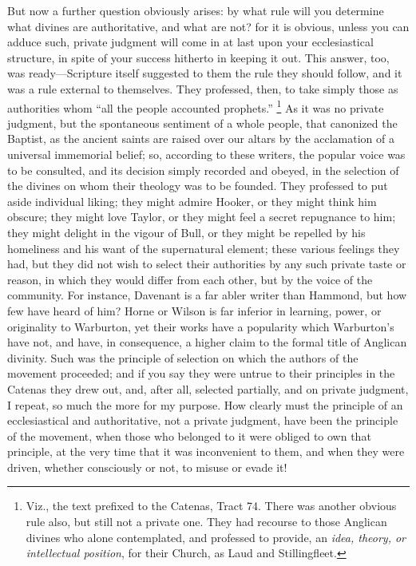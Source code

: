 But now a further question obviously arises: by what rule will you
determine what divines are authoritative, and what are not? for it is
obvious, unless you can adduce such, private judgment will come in at
last upon your ecclesiastical structure, in spite of your success
hitherto in keeping it out. This answer, too, was ready—Scripture
itself suggested to them the rule they should follow, and it was a
rule external to themselves. They professed, then, to take simply
those as authorities whom ``all the people accounted
prophets.'' \footnote{Viz., the text prefixed to the Catenas,
Tract 74. There was another obvious rule also, but still not a private
one. They had recourse to those Anglican divines who alone
contemplated, and professed to provide, an \emph{idea, theory, or
intellectual position}, for their Church, as Laud and Stillingfleet.} As it
was no private judgment, but the spontaneous sentiment of a whole
people, that canonized the Baptist, as the ancient saints are raised
over our altars by the acclamation of a universal immemorial belief;
so, according to these writers, the popular voice was to be consulted,
and its decision simply recorded and obeyed, in the selection of the
divines on whom their theology was to be founded. They professed to
put aside individual liking; they might admire Hooker, or they might
think him obscure; they might love Taylor, or they might feel a secret
repugnance to him; they might delight in the vigour of Bull, or they
might be repelled by his homeliness and his want of the supernatural
element; these various feelings they had, but they did not wish to
select their authorities by any such private taste or reason, in which
they would differ from each other, but by the voice of the community.
For instance, Davenant is a far abler writer than Hammond, but how few
have heard of him? Horne or Wilson is far inferior in learning, power,
or originality to Warburton, yet their works have a popularity which
Warburton's have not, and have, in consequence, a higher claim to the
formal title of Anglican divinity. Such was the principle of selection
on which the authors of the movement proceeded; and if you say they
were untrue to their principles in the Catenas they drew out, and,
after all, selected partially, and on private judgment, I repeat, so
much the more for my purpose. How clearly must the principle of an
ecclesiastical and authoritative, not a private judgment, have been
the principle of the movement, when those who belonged to it were
obliged to own that principle, at the very time that it was
inconvenient to them, and when they were driven, whether consciously
or not, to misuse or evade it!

